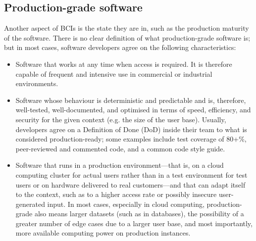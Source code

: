 \subsection{Production-grade software}
\label{chapter2-production-grade-software}

Another aspect of BCIs is the state they are in, such as the production maturity of the software. There is no clear definition of what production-grade software is; but in most cases, software developers agree on the following characteristics:

\begin{itemize}
  \item Software that works at any time when access is required. It is therefore capable of frequent and intensive use in commercial or industrial environments.
  \item Software whose behaviour is deterministic and predictable and is, therefore, well-tested, well-documented, and optimised in terms of speed, efficiency, and security for the given context (e.g. the size of the user base). Usually, developers agree on a Definition of Done (DoD) inside their team to what is considered production-ready; some examples include test coverage of 80+\%, peer-reviewed and commented code, and a common code style guide.
  \item Software that runs in a production environment—that is, on a cloud computing cluster for actual users rather than in a test environment for test users or on hardware delivered to real customers—and that can adapt itself to the context, such as to a higher access rate or possibly insecure user-generated input. In most cases, especially in cloud computing, production-grade also means larger datasets (such as in databases), the possibility of a greater number of edge cases due to a larger user base, and most importantly, more available computing power on production instances.
\end{itemize}


